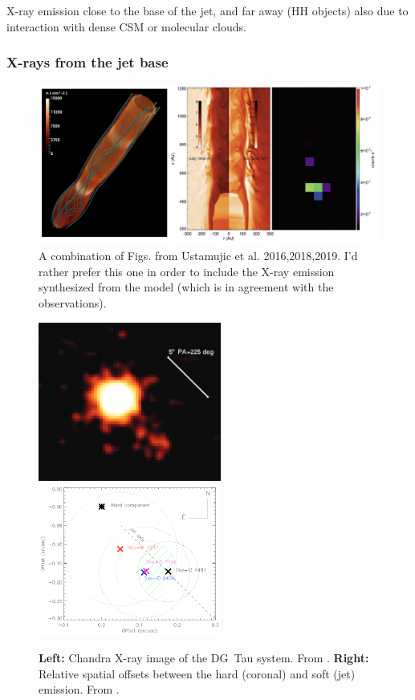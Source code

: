 X-ray emission close to the base of the jet, and far away (HH objects) also due to interaction with dense CSM or molecular clouds.



\subsubsection{X-rays from the jet base}




\begin{figure}
    \centering
    \includegraphics[width=12cm]{figs/ustamujic.png}
    \caption{A combination of Figs. from Ustamujic et al. 2016,2018,2019. I'd rather prefer this one in order to include the X-ray emission synthesized from the model (which is in agreement with the observations).}
    \label{fig:ustamujic}
\end{figure}



\begin{figure}[t]

\includegraphics[width=6cm]{figs/dg_tau_X}
\includegraphics[width=6cm]{figs/dg_tau_offsets}

\caption{{\bf Left: } Chandra X-ray image of the DG~Tau system. From \citet{2011ASPC..448..617G}.
         {\bf Right: } Relative spatial offsets between the hard (coronal) and soft (jet) emission. From \citet{Schneider_2008}. \label{fig:dg_tau_X}}
\end{figure}


